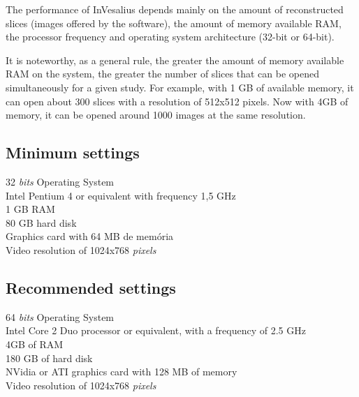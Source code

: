 
The performance of InVesalius depends mainly on the amount of reconstructed slices (images offered by the software), the amount of memory available RAM, the processor frequency and operating system architecture (32-bit or 64-bit).

It is noteworthy, as a general rule, the greater the amount of memory available RAM on the system, the greater the number of slices that can be opened simultaneously for a given study. For example, with 1 GB of available memory, it can open about 300 slices with a resolution of 512x512 pixels. Now with 4GB of memory, it can be opened around 1000 images at the same resolution.

			
\subsection{Minimum settings}
32 \textit{bits} Operating System\\
Intel Pentium 4 or equivalent with frequency 1,5 GHz\\
1 GB RAM\\
80 GB hard disk\\
Graphics card  with 64 MB de memória\\
Video resolution of 1024x768 \textit{pixels}


\subsection{Recommended settings}
64 \textit{bits} Operating System\\
Intel Core 2 Duo processor or equivalent, with a frequency of 2.5 GHz\\
4GB of RAM\\
180 GB of hard disk\\
NVidia or ATI graphics card with 128 MB of memory\\
Video resolution of 1024x768 \textit{pixels}

